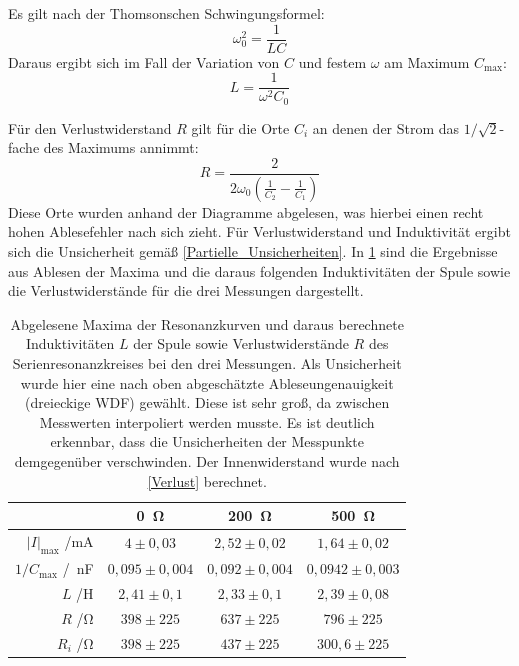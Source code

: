 \documentclass[
	a4paper,
	12pt,
	pagesize,
	ngerman
]{scrartcl}
\begin{document}
	Es gilt nach der Thomsonschen Schwingungsformel:
	\begin{equation}
		\omega_0^2=\frac{1}{LC}
	\end{equation}
	Daraus ergibt sich im Fall der Variation von $C$ und festem $\omega$ am Maximum $ C_\text{max} $:
	\begin{equation}
		L=\frac{1}{\omega^2 C_0}
		\label{Thomson}
	\end{equation}
	
	Für den Verlustwiderstand $R$ gilt für die Orte $C_i$ an denen der Strom das $ 1/\sqrt{2} $-fache des Maximums annimmt:
	\begin{equation}
		R= \frac{2}{2\omega_0 \left( \frac{1}{C_2} - \frac{1}{C_1} \right)}
	\end{equation}
	Diese Orte wurden anhand der Diagramme abgelesen, was hierbei einen recht hohen Ablesefehler nach sich zieht.
	Für Verlustwiderstand und Induktivität ergibt sich die Unsicherheit gemäß \cref{Partielle_Unsicherheiten}.
	In \cref{Serie_Erg} sind die Ergebnisse aus Ablesen der Maxima und die daraus folgenden Induktivitäten der Spule sowie die Verlustwiderstände für die drei Messungen dargestellt.
	
	\begin{table}[H]
		\centering
		\begin{tabular}{ r | c | c | c }
			&\SI{0}{\ohm} & \SI{200}{\ohm} & \SI{500}{\ohm} \\ \hline
			$\left| I \right|_\text{max}$ /\si{mA} & $4\pm 0,03$ &$2,52\pm0,02$ & $1,64\pm 0,02$\\ 
			$1/C_\text{max}$ /\si{\per \nano \farad}& $0,095 \pm 0,004$ & $0,092\pm0,004 $&$0,0942\pm0,003$ \\
			$L$ /\si{\henry} & $2,41 \pm 0,1$ & $2,33\pm 0,1 $&$2,39\pm0,08$ \\
			$R$ /\si{\ohm}  &$ 398\pm 225$&$ 637\pm 225 $ & $796 \pm 225$\\
			$R_i$ /\si{\ohm} &$ 398\pm225$ & $437\pm225$ &$300,6\pm225$ \\
		\end{tabular}
		\caption{Abgelesene Maxima der Resonanzkurven und daraus berechnete Induktivitäten $L$ der Spule sowie Verlustwiderstände $R$ des Serienresonanzkreises bei den drei Messungen. Als Unsicherheit wurde hier eine nach oben abgeschätzte Ableseungenauigkeit (dreieckige WDF) gewählt. Diese ist sehr groß, da zwischen Messwerten interpoliert werden musste. Es ist deutlich erkennbar, dass die Unsicherheiten der Messpunkte demgegenüber verschwinden. Der Innenwiderstand wurde nach \cref{Verlust} berechnet.}
		\label{Serie_Erg} 
	\end{table}
	
\end{document}
